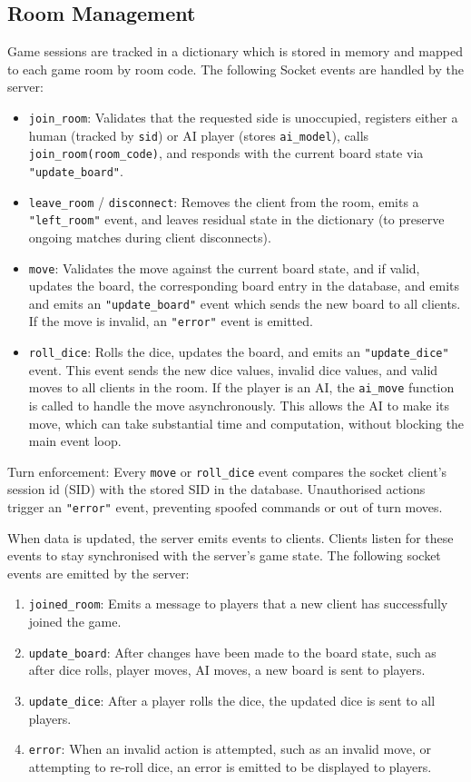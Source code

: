 \subsection{Room Management}
\label{sec:room-management}
Game sessions are tracked in a dictionary which is stored in memory and mapped to each game room by room code. The following Socket events are handled by the server:
\begin{itemize}
\item \texttt{join\_room}: Validates that the requested side is unoccupied, registers either a human (tracked by \texttt{sid}) or AI player (stores \texttt{ai\_model}), calls \texttt{join\_room(room\_code)}, and responds with the current board state via \texttt{"update\_board"}.
\item \texttt{leave\_room} / \texttt{disconnect}: Removes the client from the room, emits a \texttt{"left\_room"} event, and leaves residual state in the dictionary (to preserve ongoing matches during client disconnects).
\item \texttt{move}: Validates the move against the current board state, and if valid, updates the board, the corresponding board entry in the database, and emits and emits an \texttt{"update\_board"} event which sends the new board to all clients. If the move is invalid, an \texttt{"error"} event is emitted.
\item \texttt{roll\_dice}: Rolls the dice, updates the board, and emits an \texttt{"update\_dice"} event. This event sends the new dice values, invalid dice values, and valid moves to all clients in the room. 
If the player is an AI, the \texttt{ai\_move} function is called to handle the move asynchronously. This allows the AI to make its move, which can take substantial time and computation, without blocking the main event loop.
\end{itemize}
Turn enforcement: Every \texttt{move} or \texttt{roll\_dice} event compares the socket client's session id (SID) with the stored SID in the database. Unauthorised actions trigger an \texttt{"error"} event, preventing spoofed commands or out of turn moves.

When data is updated, the server emits events to clients. Clients listen for these events to stay synchronised with the server's game state.
The following socket events are emitted by the server:
\begin{enumerate}
    \item \texttt{joined\_room}: Emits a message to players that a new client has successfully joined the game.
    
    \item \texttt{update\_board}: After changes have been made to the board state, such as after dice rolls, player moves, AI moves, a new board is sent to players. 

    \item \texttt{update\_dice}: After a player rolls the dice, the updated dice is sent to all players.

    \item \texttt{error}: When an invalid action is attempted, such as an invalid move, or attempting to re-roll dice, an error is emitted to be displayed to players.
\end{enumerate}


